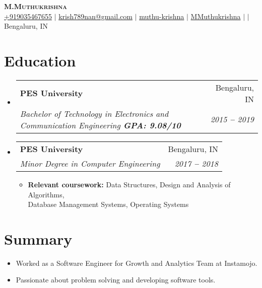 \documentclass[letterpaper,12pt]{article}
\makeatletter
\newcommand{\resumeItem}[1]{
  \item\small{
    {#1 \vspace{-2pt}}
  }
}
\newcommand{\resumeSubheading}[4]{
  \vspace{-2pt}\item
    \begin{tabular*}{0.97\textwidth}[t]{l@{\extracolsep{\fill}}r}
      \textbf{#1} & #2 \\
      \textit{\small#3} & \textit{\small #4} \\
    \end{tabular*}\vspace{-7pt}
}
\newcommand{\resumeSubHeadingListStart}{\begin{itemize}[leftmargin=0.15in, label={}]}
\newcommand{\resumeSubHeadingListEnd}{\end{itemize}}
\newcommand{\resumeItemListStart}{\begin{itemize}}
\newcommand{\resumeItemListEnd}{\end{itemize}\vspace{-5pt}}
\makeatother
\begin{document}

\begin{center}
    \textbf{\Huge \scshape M.Muthukrishna} \\ \vspace{3pt}
    \small
    \faMobile \hspace{.5pt} \href{tel:919035467655}{+919035467655}
    $|$
    \faAt \hspace{.5pt} \href{mailto:krish789nan@gmail.com}{krish789nan@gmail.com}
    $|$
    \faLinkedinSquare \hspace{.5pt} \href{https://www.linkedin.com/in/muthu-krishna-864513117/}{muthu-krishna}
    $|$
    \faGithub \hspace{.5pt} \href{https://github.com/MMuthukrishna}{MMuthukrishna}
    $|$
    $|$
    \faMapMarker \hspace{.5pt} {Bengaluru, IN}
\end{center}




\section{Education}
  \vspace{3pt}
  \resumeSubHeadingListStart

    \resumeSubheading
      {PES University}{Bengaluru, IN}
      {Bachelor of Technology in Electronics and Communication Engineering  \textbf{GPA: 9.08/10}}{2015 \textbf{--} 2019}
    \resumeSubheading
      {PES University}{Bengaluru, IN}
      {Minor Degree in Computer Engineering}{2017 \textbf{--} 2018}
        \resumeItemListStart
            \resumeItem{\textbf{Relevant coursework:} Data Structures, Design and Analysis of Algorithms,\\ Database Management Systems, Operating Systems}
        \resumeItemListEnd

  \resumeSubHeadingListEnd


\section{Summary}
  \vspace{1pt}
  \resumeSubHeadingListStart
  \small{\item{
	\resumeItemListStart
		\resumeItem{Worked as a Software Engineer for Growth and Analytics Team at Instamojo.}	\\ \vspace{2pt}
		\resumeItem{Passionate about problem solving and developing software tools.}
	\resumeItemListEnd
	}}
  \resumeSubHeadingListEnd
\end{document}
